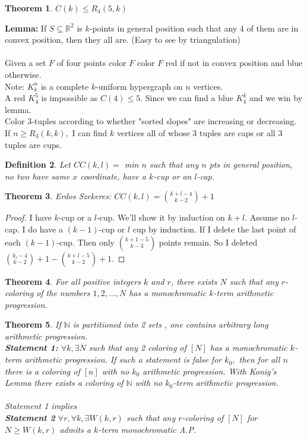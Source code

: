 \documentclass[a4paper]{article}
\newtheorem{thm}{Theorem}[section]
\newtheorem{defn}[thm]{Definition}
\begin{document}
\begin{thm}
    $C(k)\leq R_4(5,k)$
\end{thm}
\noindent\textbf{Lemma:} If $S\subseteq \mathbb{R}^2$ is $k$-points in general position such that any $4$ of them are in convex position, then they all are. (Easy to see by triangulation)  \\\\
Given a set $F$ of four points color $F$ color $F$ red if not in convex position and blue otherwise.\\
Note: $K_k^n$ is a complete $k$-uniform hypergraph on $n$ vertices.\\
A red $K_4^5$ is impossible as $C(4)\leq 5$. Since we can find a blue $K_4^k$ and we win by lemma. \\
Color $3$-tuples according to whether "sorted slopes" are increasing or decreasing. If $n\geq R_3(k,k),$ I can find $k$ vertices all of whose $3$ tuples are caps or all $3$ tuples are cups. 
\begin{defn}
    Let $CC(k,l)=$ min $n$ such that any $n$ pts in general position, no two have same $x$ coordinate, have a $k$-cup or an $l$-cap. 
\end{defn}
\begin{thm}
    Erdos Szekeres: $CC(k,l)={k + l -4 \choose k-2}+1$
\end{thm}
\begin{proof}
    I have $k$-cup or a $l$-cup. We'll show it by induction on $k+l.$ Assume no $l$-cap. I do have a $(k-1)$-cup or $l$ cup by induction. If I delete the last point of each $(k-1)$-cup. Then only ${k+1-5 \choose k-3}$ points remain. So I deleted ${k_l-4 \choose k-2}+1-{k+l-5 \choose k-2}+1.$ 
\end{proof}
\begin{thm}
    For all positive integers $k$ and $r$, there exists $N$ such that any
$r$-coloring of the numbers $1, 2, . . . , N$ has a monochromatic $k$-term arithmetic progression.
\end{thm}
\begin{thm}
    If $\mathbb{N}$ is partitioned into 2 sets , one contains arbitrary long arithmetic progression.\\
    \textbf{Statement 1:} $\forall k, \exists N$ such that any 2 coloring of $[N]$ has a monochromatic $k$-term arithmetic progression. If such a statement is false for $k_0,$ then for all $n$ there is a coloring of $[n]$ with no $k_0$ arithmetic progression. With Konig's Lemma there exists a coloring of $\mathbb{N}$ with no $k_0$-term arithmetic progression.\\\\
    Statement 1 implies \\
    \textbf{Statement 2} $\forall r, \forall k, \exists W(k,r)$ such that any $r$-coloring of $[N]$ for $N\geq W(k,r)$ admits a $k$-term monochromatic A.P. 
 \end{thm}
\end{document}
